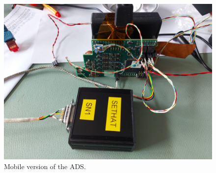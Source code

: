 \begin{figure}[h]
    \centering
    \includegraphics[width=0.7\linewidth]{images/03_data/sethat_mobile.jpg}
    \caption{Mobile version of the \ac{ADS}.}
    \label{fig:ads_mobile}
\end{figure}